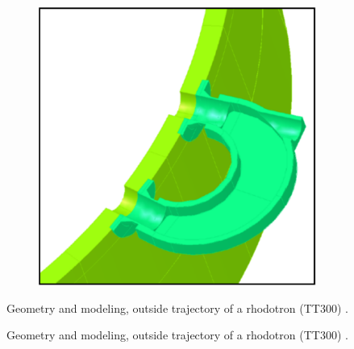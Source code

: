 \documentclass[a4paper,oneside,12pt]{report}
\numberwithin{equation}{chapter}
\begin{document}
\begin{figure}[H]
\begin{subfigure}{.5\textwidth}
      \includegraphics[width=.9\linewidth]{./figures/design/tt300_mag.png}
    \end{subfigure}
    \caption{Geometry and modeling, outside trajectory of a rhodotron (TT300) \cite{cite:rhodo_design}.}
    \label{fig:magnet_design_illustrations}
\end{figure} \fi
\vspace{20pt}
\begin{figure}[H]
    \centering
    \qquad{}%
    \vspace{20pt}
    \caption{\centering Geometry and modeling, outside trajectory of a rhodotron (TT300) \cite{cite:rhodo_design}.} 
    \label{fig:magnet_design_illustrations}
\end{figure}
\end{document}
